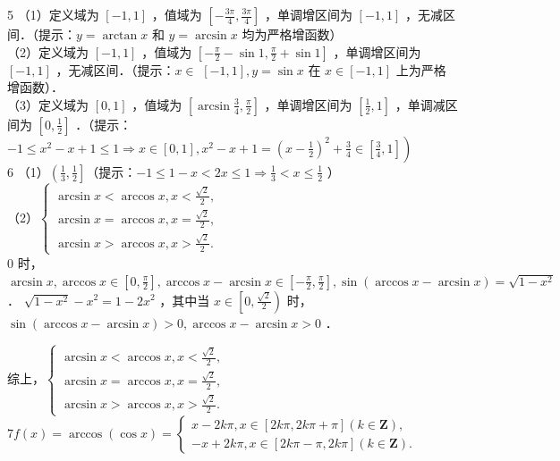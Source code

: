 \documentclass[10pt]{article}
\begin{document}
5 （1）定义域为 \([-1,1]\) ，值域为 \(\left[-\frac{3 \pi}{4}, \frac{3 \pi}{4}\right]\) ，单调增区间为 \([-1,1]\) ，无减区间．（提示：\(y=\arctan x\) 和 \(y=\arcsin x\) 均为严格增函数）\\
（2）定义域为 \([-1,1]\) ，值域为 \(\left[-\frac{\pi}{2}-\sin 1, \frac{\pi}{2}+\sin 1\right]\) ，单调增区间为 \([-1,1]\) ，无减区间．（提示：\(x \in\) \([-1,1], y=\sin x\) 在 \(x \in[-1,1]\) 上为严格增函数）．\\
（3）定义域为 \([0,1]\) ，值域为 \(\left[\arcsin \frac{3}{4}, \frac{\pi}{2}\right]\) ，单调增区间为 \(\left[\frac{1}{2}, 1\right]\) ，单调减区间为 \(\left[0, \frac{1}{2}\right]\) ．（提示：\\
\(\left.-1 \leqslant x^{2}-x+1 \leqslant 1 \Rightarrow x \in[0,1], x^{2}-x+1=\left(x-\frac{1}{2}\right)^{2}+\frac{3}{4} \in\left[\frac{3}{4}, 1\right]\right)\)\\
6 （1）\(\left(\frac{1}{3}, \frac{1}{2}\right]\)（提示：\(-1 \leqslant 1-x<2 x \leqslant 1 \Rightarrow \frac{1}{3}<x \leqslant \frac{1}{2}\) ）\\
（2）\(\left\{\begin{array}{l}\arcsin x<\arccos x, x<\frac{\sqrt{2}}{2}, \\ \arcsin x=\arccos x, x=\frac{\sqrt{2}}{2}, \\ \arcsin x>\arccos x, x>\frac{\sqrt{2}}{2} .\end{array}\right.\)\\
0 时， \(\arcsin x, \arccos x \in\left[0, \frac{\pi}{2}\right], \arccos x-\arcsin x \in\left[-\frac{\pi}{2}, \frac{\pi}{2}\right], \sin (\arccos x-\arcsin x)=\sqrt{1-x^{2}}\) ． \(\sqrt{1-x^{2}}-x^{2}=1-2 x^{2}\) ，其中当 \(x \in\left[0, \frac{\sqrt{2}}{2}\right)\) 时， \(\sin (\arccos x-\arcsin x)>0, \arccos x-\arcsin x>0\) ．

综上，\(\left\{\begin{array}{l}\arcsin x<\arccos x, x<\frac{\sqrt{2}}{2}, \\ \arcsin x=\arccos x, x=\frac{\sqrt{2}}{2}, \\ \arcsin x>\arccos x, x>\frac{\sqrt{2}}{2} .\end{array}\right.\)\\
\(7 f(x)=\arccos (\cos x)=\left\{\begin{array}{l}x-2 k \pi, x \in[2 k \pi, 2 k \pi+\pi](k \in \mathbf{Z}), \\ -x+2 k \pi, x \in[2 k \pi-\pi, 2 k \pi](k \in \mathbf{Z}) .\end{array}\right.\)
\end{document}
